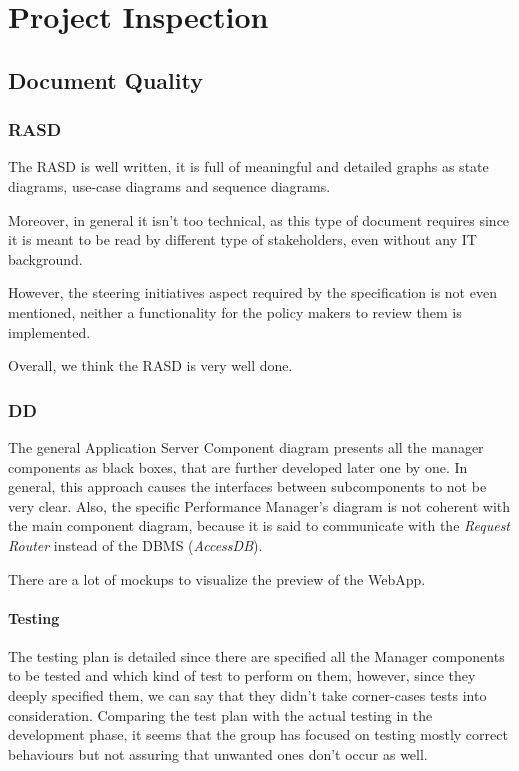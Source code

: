 \documentclass[table, 12pt]{article}
\begin{document}
\section{Project Inspection}

\subsection{Document Quality}
\subsubsection{RASD}
The RASD is well written, it is full of meaningful and detailed graphs as state diagrams, use-case diagrams and sequence diagrams. 

Moreover, in general it isn't too technical, as this type of document requires since it is meant to be read by different type of stakeholders, even without any IT background.

However, the steering initiatives aspect required by the specification is not even mentioned, neither a functionality for the policy makers to review them is implemented.

Overall, we think the RASD is very well done.

\subsubsection{DD}
The general Application Server Component diagram presents all the manager components as black boxes, that are further developed later one by one. In general, this approach causes the interfaces between subcomponents to not be very clear. Also, the specific Performance Manager's diagram is not coherent with the main component diagram, because it is said to communicate with the \textit{Request Router} instead of the DBMS (\textit{AccessDB}).

There are a lot of mockups to visualize the preview of the WebApp.

\paragraph{Testing}
The testing plan is detailed since there are specified all the Manager components to be tested and  which kind of test to perform on them, however, since they deeply specified them, we can say that they didn't take corner-cases tests into consideration. Comparing the test plan with the actual testing in the development phase, it seems that the group has focused on testing mostly correct behaviours but not assuring that unwanted ones don't occur as well. 
\end{document}
